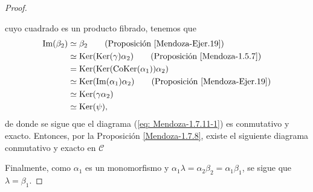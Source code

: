 \documentclass[tesis]{subfiles}
\begin{document}
\begin{proof}
\begin{center}
    \end{center}
    cuyo cuadrado es un producto fibrado, tenemos que
    \begin{align*}
        \text{Im}(\beta_2) &\simeq \beta_2 \tag{Proposición \ref{Mendoza-Ejer.19}} \\
                           &\simeq \text{Ker}(\text{Ker}(\gamma)\alpha_2) \tag{Proposición \ref{Mendoza-1.5.7}} \\
                           &= \text{Ker}(\text{Ker}(\text{CoKer}(\alpha_1))\alpha_2) \\
                           &\simeq \text{Ker}(\text{Im}(\alpha_1)\alpha_2) \tag{Proposición \ref{Mendoza-Ejer.19}} \\
                           &\simeq \text{Ker}(\gamma\alpha_2) \\
                           &\simeq \text{Ker}(\psi),
    \end{align*}
    de donde se sigue que el diagrama (\ref{eq: Mendoza-1.7.11-1}) es conmutativo y exacto. Entonces, por la Proposición \ref{Mendoza-1.7.8}, existe el siguiente diagrama conmutativo y exacto en $\mathscr{C}$
    \begin{center}
    \end{center}
    Finalmente, como $\alpha_1$ es un monomorfismo y $\alpha_1\lambda = \alpha_2\beta_2 = \alpha_1\beta_1$, se sigue que $\lambda=\beta_1$.
\end{proof}
\end{document}
